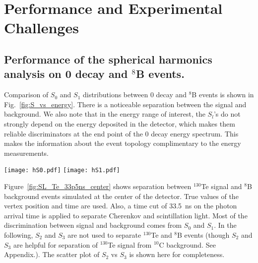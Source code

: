 \section{Performance and Experimental Challenges}
\label{sec:performance_and_challenges}

\subsection{Performance of the spherical harmonics analysis on 0{\nbb} decay and $^{8}$B events.}

Comparison of $S_0$ and $S_1$ distributions between 0{\nbb} decay and
$^{8}$B events is shown in Fig.~\ref{fig:S_vs_energy}. There is a
noticeable separation between the signal and background. We also note
that in the energy range of interest, the $S_l$'s do not strongly
depend on the energy deposited in the detector, which makes them
reliable discriminators at the end point of the 0{\nbb} decay energy
spectrum. This makes the information about the event topology complimentary to
the energy measurements.

\begin{figure*}[h]
\centering
\texttt{[image: hS0.pdf]}
\texttt{[image: hS1.pdf]}
\caption{$S_0$ (\emph{left}) and $S_1$ (\emph{right}) distributions
  for events with two different event topologies and total kinetic
  energy. $^{130}$Te, $^{82}$Se 0{\nbb} decay, 2.529 MeV and 2.995 MeV
  events are compared. The simulation is done for events with the
  vertex in the center of the detector. $^{8}$B events are implemented
  as 2.529~MeV or 2.995~MeV electrons with initial direction along
  $x$-axis. Perfect vertex reconstruction - true vertex position is
  used. Time cut of 33.5~ns on the photon arrival time is applied.}
\label{fig:S_vs_energy}
\end{figure*}

Figure~\ref{fig:SL_Te_33p5ns_center} shows separation between
$^{130}$Te signal and $^{8}$B background events simulated at the
center of the detector. True values of the vertex position and time are
used. Also, a time cut of 33.5~ns on the photon arrival time is applied to
separate Cherenkov and scintillation light. Most of the discrimination
between signal and background comes from $S_0$ and $S_1$. In the
following, $S_2$ and $S_3$ are not used to separate $^{130}$Te and
$^{8}$B events (though $S_2$ and $S_3$ are helpful for separation of
  $^{130}$Te signal from $^{10}$C background. See Appendix.). The
scatter plot of $S_2$ vs $S_3$ is shown here for completeness.

